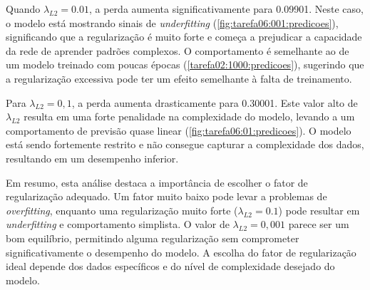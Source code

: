 Quando $\lambda_{L2}=0.01$, a perda aumenta significativamente para 0.09901. 
Neste caso, o 
modelo está mostrando sinais de \textit{underfitting} 
(\cref{fig:tarefa06:001:predicoes}), significando que a 
regularização é muito forte e começa a prejudicar a capacidade da rede de 
aprender padrões complexos. O comportamento é semelhante ao de um modelo 
treinado com poucas épocas (\cref{tarefa02:1000:predicoes}), sugerindo que a 
regularização excessiva pode ter um 
efeito semelhante à falta de treinamento.

Para $\lambda_{L2}=0,1$, a perda aumenta drasticamente para 0.30001. Este valor 
alto de $\lambda_{L2}$ 
resulta em uma forte penalidade na complexidade do modelo, levando a um 
comportamento de previsão quase linear (\cref{fig:tarefa06:01:predicoes}). O 
modelo está sendo fortemente restrito 
e não consegue capturar a complexidade dos dados, resultando em um desempenho 
inferior.

Em resumo, esta análise destaca a importância de escolher o fator de 
regularização adequado. Um fator muito baixo pode levar a 
problemas de \textit{overfitting}, enquanto uma regularização muito forte 
($\lambda_{L2}=0.1$) 
pode 
resultar em \textit{underfitting} e comportamento simplista. O valor de 
$\lambda_{L2}=0,001$ 
parece ser um bom equilíbrio, permitindo alguma regularização sem comprometer 
significativamente o desempenho do modelo. A escolha do fator de regularização 
ideal depende dos dados específicos e do nível de complexidade desejado do 
modelo.